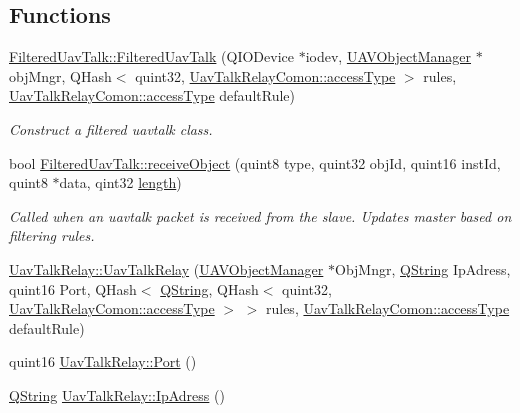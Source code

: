 \subsection*{\-Functions}
\begin{DoxyCompactItemize}
\item 
\hyperlink{group___u_a_v_talk_ga618403abe72042a54b38faa22c1c5e5f}{\-Filtered\-Uav\-Talk\-::\-Filtered\-Uav\-Talk} (\-Q\-I\-O\-Device $\ast$iodev, \hyperlink{class_u_a_v_object_manager}{\-U\-A\-V\-Object\-Manager} $\ast$obj\-Mngr, \-Q\-Hash$<$ quint32, \hyperlink{group___u_a_v_talk_plugin_gae73e1677650d617d825cf2224fa0626a}{\-Uav\-Talk\-Relay\-Comon\-::access\-Type} $>$ rules, \hyperlink{group___u_a_v_talk_plugin_gae73e1677650d617d825cf2224fa0626a}{\-Uav\-Talk\-Relay\-Comon\-::access\-Type} default\-Rule)
\begin{DoxyCompactList}\small\item\em \-Construct a filtered uavtalk class. \end{DoxyCompactList}\item 
bool \hyperlink{group___u_a_v_talk_gae0a55c71a396a0577dd48dad6188a7a0}{\-Filtered\-Uav\-Talk\-::receive\-Object} (quint8 type, quint32 obj\-Id, quint16 inst\-Id, quint8 $\ast$data, qint32 \hyperlink{uavobjecttemplate_8m_a076bf56c9bafa07f3dbda4901a40d84c}{length})
\begin{DoxyCompactList}\small\item\em \-Called when an uavtalk packet is received from the slave. \-Updates master based on filtering rules. \end{DoxyCompactList}\item 
\hyperlink{group___u_a_v_talk_gac8b1e7722bbeccbae7c3dcea8d1fe222}{\-Uav\-Talk\-Relay\-::\-Uav\-Talk\-Relay} (\hyperlink{class_u_a_v_object_manager}{\-U\-A\-V\-Object\-Manager} $\ast$\-Obj\-Mngr, \hyperlink{group___u_a_v_objects_plugin_gab9d252f49c333c94a72f97ce3105a32d}{\-Q\-String} \-Ip\-Adress, quint16 \-Port, \-Q\-Hash$<$ \hyperlink{group___u_a_v_objects_plugin_gab9d252f49c333c94a72f97ce3105a32d}{\-Q\-String}, \-Q\-Hash$<$ quint32, \hyperlink{group___u_a_v_talk_plugin_gae73e1677650d617d825cf2224fa0626a}{\-Uav\-Talk\-Relay\-Comon\-::access\-Type} $>$ $>$ rules, \hyperlink{group___u_a_v_talk_plugin_gae73e1677650d617d825cf2224fa0626a}{\-Uav\-Talk\-Relay\-Comon\-::access\-Type} default\-Rule)
\item 
quint16 \hyperlink{group___u_a_v_talk_gaa880d4612e6112e7a8c320cca690f31a}{\-Uav\-Talk\-Relay\-::\-Port} ()
\item 
\hyperlink{group___u_a_v_objects_plugin_gab9d252f49c333c94a72f97ce3105a32d}{\-Q\-String} \hyperlink{group___u_a_v_talk_ga8f99b1f0add7784e3aad75a0784728bb}{\-Uav\-Talk\-Relay\-::\-Ip\-Adress} ()

\end{DoxyCompactItemize}
